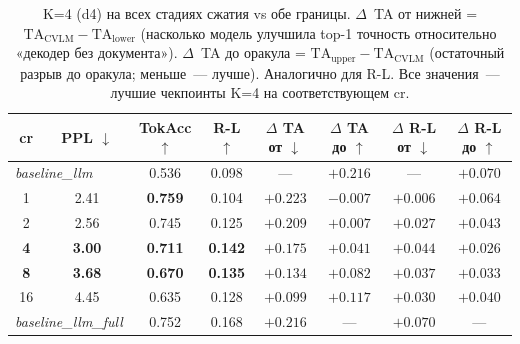 \documentclass[a4paper,12pt]{extarticle}
\begin{document}
\begin{table}[ht]
\centering
\caption{K=4 (d4) на всех стадиях сжатия vs обе границы. $\Delta$~TA от нижней = $\mathrm{TA}_{\text{CVLM}} - \mathrm{TA}_{\text{lower}}$ (насколько модель улучшила top-1 точность относительно «декодер без документа»). $\Delta$~TA до оракула = $\mathrm{TA}_{\text{upper}} - \mathrm{TA}_{\text{CVLM}}$ (остаточный разрыв до оракула; меньше~--- лучше). Аналогично для R-L. Все значения~--- лучшие чекпоинты K=4 на соответствующем cr.}
\label{tab:vs-baselines-multi-cr}
\footnotesize
\begin{tabular}{cccc|cc|cc}
\toprule
\textbf{cr} & \textbf{PPL} $\downarrow$ & \textbf{TokAcc} $\uparrow$ & \textbf{R-L} $\uparrow$ & $\Delta$ \textbf{TA от $\downarrow$} & $\Delta$ \textbf{TA до $\uparrow$} & $\Delta$ \textbf{R-L от $\downarrow$} & $\Delta$ \textbf{R-L до $\uparrow$} \\
\midrule
\multicolumn{2}{l}{\textit{baseline\_llm}} & 0.536 & 0.098 & --- & $+0.216$ & --- & $+0.070$ \\
\midrule
1   & 2.41          & \textbf{0.759} & 0.104          & $+0.223$ & $-0.007$ & $+0.006$ & $+0.064$ \\
2   & 2.56          & 0.745          & 0.125          & $+0.209$ & $+0.007$ & $+0.027$ & $+0.043$ \\
\textbf{4}   & \textbf{3.00} & \textbf{0.711} & \textbf{0.142} & $+0.175$ & $+0.041$ & $+0.044$ & $+0.026$ \\
\textbf{8}   & \textbf{3.68} & \textbf{0.670} & \textbf{0.135} & $+0.134$ & $+0.082$ & $+0.037$ & $+0.033$ \\
16  & 4.45          & 0.635          & 0.128          & $+0.099$ & $+0.117$ & $+0.030$ & $+0.040$ \\
\midrule
\multicolumn{2}{l}{\textit{baseline\_llm\_full}} & 0.752 & 0.168 & $+0.216$ & --- & $+0.070$ & --- \\
\bottomrule
\end{tabular}
\end{table}
\end{document}

